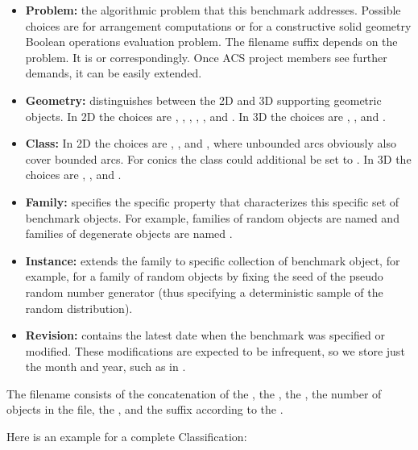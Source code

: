 \begin{itemize}
  \item {\bf Problem:} the algorithmic problem that this benchmark
    addresses. Possible choices are  for arrangement
    computations or  for a constructive solid
    geometry Boolean operations evaluation problem. The filename
    suffix  depends on the problem. It is  or 
    correspondingly. Once ACS project members see further demands, 
    it can be easily extended.
  \item {\bf Geometry:} distinguishes between the 2D and 3D supporting
    geometric objects. In 2D the choices are ,
    , , , , and
    . In 3D the choices are 
    , , and .
  \item {\bf Class:} In 2D the choices are ,
    , and , where unbounded arcs
    obviously also cover bounded arcs. For conics the class could
    additional be set to . In 3D the choices are
    , , and . 
  \item {\bf Family:} specifies the specific property that
    characterizes this specific set of benchmark objects. For example,
    families of random objects are named  and families of
    degenerate objects are named . 
  \item {\bf Instance:} extends the family to specific collection of
    benchmark object, for example, for a family of random objects by
    fixing the seed of the pseudo random number generator (thus
    specifying a deterministic sample of the random distribution).
  \item {\bf Revision:} contains the latest date when the benchmark was
    specified or modified. These modifications are expected to be
    infrequent, so we store just the month and year, such as in
    . 
\end{itemize}

\noindent
The filename consists of the concatenation of the , the
, the , the number of objects in the file, the
, and the suffix according to the .

Here is an example for a complete Classification:


